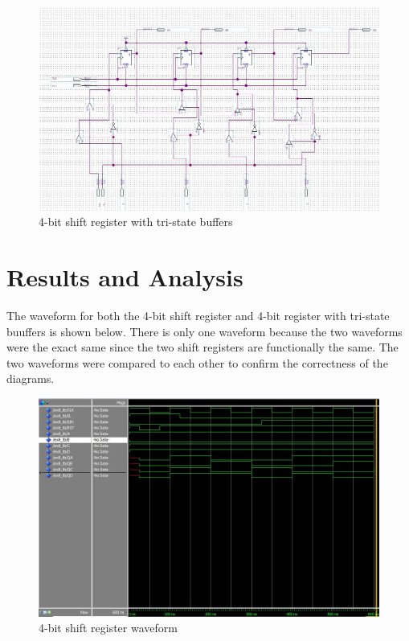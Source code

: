 \documentclass[CMPE]{KGCOEReport}
\begin{document}
\begin{figure}[H]
	\centering
	\includegraphics[width=\textwidth]{Circuit2.png}
	\caption{4-bit shift register with tri-state buffers}
	\label{fig: Figure 2}
\end{figure}

\section*{Results and Analysis} 
The waveform for both the 4-bit shift register and 4-bit register with tri-state buuffers is shown below. There is only one waveform because the two waveforms were the exact same since the two shift registers are functionally the same. The two waveforms were compared to each other to confirm the correctness of the diagrams. 

\begin{figure}[H]
	\centering
	\includegraphics[width=\textwidth]{ModelSim.png}
	\caption{4-bit shift register waveform}
	\label{fig: Figure 3}
\end{figure}
\end{document}
